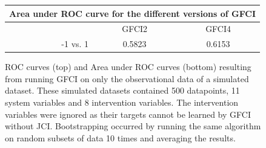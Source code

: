 \documentclass[a4paper,pdf]{article}
\begin{document}
\begin{figure}[!ht]
    \centering   
    \renewcommand{\arraystretch}{2}
    \setlength{\tabcolsep}{7pt}
    \begin{tabular}{|r|c|c|}
        \multicolumn{3}{c}{\large{\textbf{Area under ROC curve for the different versions of GFCI}}}\\
        \hline
                 & GFCI2 & GFCI4\\ \hline
        -1 vs. 1 & 0.5823 & 0.6153\\ \hline
    \end{tabular}
    \caption{ROC curves (top) and Area under ROC curves (bottom) resulting from running GFCI on only the observational data of a simulated dataset. These simulated datasets contained 500 datapoints, 11 system variables and 8 intervention variables. The intervention variables were ignored as their targets cannot be learned by GFCI without JCI. Bootstrapping occurred by running the same algorithm on random subsets of data 10 times and averaging the results.\label{fig:obssimgraphgfcifull}}

\end{figure}
\end{document}
